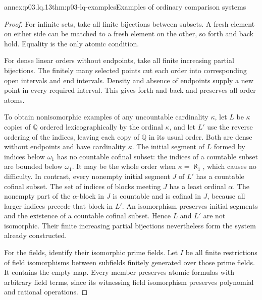 \begin{annexitem}{annex:p03.lq.13}{thm:p03-lq-examples}{Examples of ordinary comparison systems}
\begin{proof}
For infinite sets, take all finite bijections between subsets. A
fresh element on either side can be matched to a fresh element on
the other, so forth and back hold. Equality is the only atomic
condition.

For dense linear orders without endpoints, take all finite
increasing partial bijections. The finitely many selected points
cut each order into corresponding open intervals and end intervals.
Density and absence of endpoints supply a new point in every
required interval. This gives forth and back and preserves all
order atoms.

To obtain nonisomorphic examples of any uncountable cardinality
\(\kappa\), let \(L\) be \(\kappa\) copies of \(\mathbb Q\)
ordered lexicographically by the ordinal \(\kappa\), and let
\(L'\) use the reverse ordering of the indices, leaving each copy
of \(\mathbb Q\) in its usual order. Both are dense without
endpoints and have cardinality \(\kappa\).
The initial segment of \(L\) formed by indices below \(\omega_1\)
has no countable cofinal subset: the indices of a countable subset
are bounded below \(\omega_1\). It may be the whole order when
\(\kappa=\aleph_1\), which causes no difficulty.
In contrast, every nonempty initial segment \(J\) of \(L'\) has
a countable cofinal subset. The set of indices of blocks meeting
\(J\) has a least ordinal \(\alpha\). The nonempty part of the
\(\alpha\)-block in \(J\) is countable and is cofinal in \(J\),
because all larger indices precede that block in \(L'\).
An isomorphism preserves initial segments and the existence of a
countable cofinal subset. Hence \(L\) and \(L'\) are not isomorphic.
Their finite increasing partial bijections nevertheless form the
system already constructed.

For the fields, identify their isomorphic prime fields. Let \(I\)
be all finite restrictions of field isomorphisms between subfields
finitely generated over those prime fields. It contains the empty
map. Every member preserves atomic formulas with arbitrary field
terms, since its witnessing field isomorphism preserves polynomial
and rational operations.


\end{proof}
\end{annexitem}
